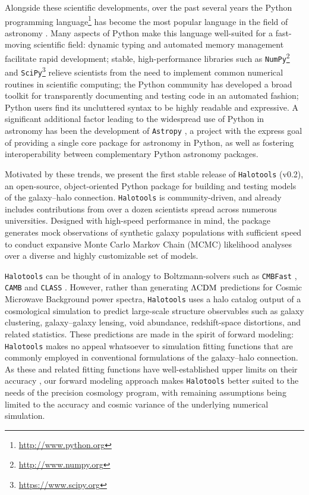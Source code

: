 \documentclass[twocolumn, tighten]{aastex6}
\begin{document}
Alongside these scientific developments, over the past several years the Python programming language\footnote{\url{http://www.python.org}} has become the most popular language in the field of astronomy \citep{momcheva_tollerud15}. Many aspects of Python make this language well-suited for a fast-moving scientific field: dynamic typing and automated memory management facilitate rapid development; stable, high-performance libraries such as {\tt NumPy}\footnote{\url{http://www.numpy.org}}\citep{numpy_array} and {\tt SciPy}\footnote{\url{https://www.scipy.org}}\citep{scipy} relieve scientists from the need to implement common numerical routines in scientific computing; the Python community has developed a broad toolkit for transparently documenting and testing code in an automated fashion; Python users find its uncluttered syntax to be highly readable and expressive. A significant additional factor leading to the widespread use of Python in astronomy has been the development of  {\tt Astropy} \citep{astropy}, a project with the express goal of providing a single core package for astronomy in Python, as well as fostering interoperability between complementary Python astronomy packages.

Motivated by these trends, we present the first stable release of {\tt Halotools} (v0.2), an open-source, object-oriented Python package for building and testing models of the galaxy--halo connection. {\tt Halotools} is community-driven, and already includes contributions from over a dozen scientists spread across numerous universities. Designed with high-speed performance in mind, the package generates mock observations of synthetic galaxy populations with sufficient speed to conduct expansive  Monte Carlo Markov Chain (MCMC) likelihood analyses over a diverse and highly customizable set of models. 

{\tt Halotools} can be thought of in analogy to Boltzmann-solvers such as {\tt CMBFast} \citep{cmbfast}, {\tt CAMB} \citep{camb} and {\tt CLASS} \citep{class}. However, rather than generating $\Lambda{\rm CDM}$ predictions for Cosmic Microwave Background power spectra, {\tt Halotools} uses a halo catalog output of a cosmological simulation to predict large-scale structure observables such as galaxy clustering, galaxy--galaxy lensing, void abundance, redshift-space distortions, and related statistics. These predictions are made in the spirit of forward modeling: {\tt Halotools} makes no appeal whatsoever to simulation fitting functions \citep[e.g.,][]{sheth_tormen01,tinker05} that are commonly employed in conventional formulations of the galaxy--halo connection. As these and related fitting functions have well-established upper limits on their accuracy \citep[e.g.,][]{tinker08a}, our forward modeling approach makes {\tt Halotools} better suited to the needs of the precision cosmology program, with remaining assumptions being limited to the accuracy and cosmic variance of the underlying numerical simulation.
\end{document}
